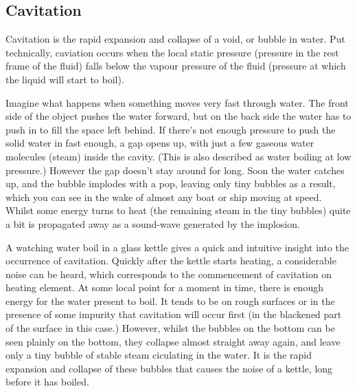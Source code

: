 \documentclass{article}\usepackage[]{graphicx}\usepackage[]{color}
\begin{document}
\subsection{Cavitation}

Cavitation is the rapid expansion and collapse of a void, or bubble in water. Put technically, caviation occurs when the local static pressure (pressure in the rest frame of the fluid) falls below the vapour pressure of the fluid (pressure at which the liquid will start to boil).

Imagine what happens when something moves very fast through water.  The front side of the object pushes the water forward, but on the back side the water has to push in to fill the space left behind.  If there’s not enough pressure to push the solid water in fast enough, a gap opens up, with just a few gaseous water molecules (steam) inside the cavity.  (This is also described as water boiling at low pressure.)  However the gap doesn’t stay around for long.  Soon the water catches up, and the bubble implodes with a pop, leaving only tiny bubbles as a result, which you can see in the wake of almost any boat or ship moving at speed.  Whilst some energy turns to heat (the remaining steam in the tiny bubbles) quite a bit is propagated away as a sound-wave generated by the implosion.

A watching water boil in a glass kettle gives a quick and intuitive insight into the occurrence of cavitation.  Quickly after the kettle starts heating, a considerable noise can be heard, which corresponds to the commencement of cavitation on heating element. At some local point for a moment in time, there is enough energy for the water present to boil.  It tends to be on rough surfaces or in the presence of some impurity that cavitation will occur first (in the blackened part of the surface in this case.)  However, whilst the bubbles on the bottom can be seen plainly on the bottom, they collapse almost straight away again, and leave only a tiny bubble of stable steam ciculating in the water.  It is the rapid expansion and collapse of these bubbles that causes the noise of a kettle, long before it has boiled.
\end{document}
